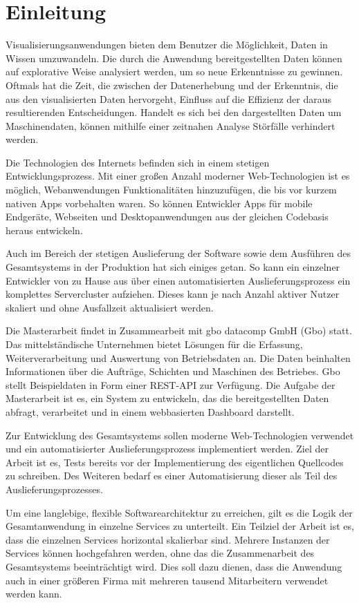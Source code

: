 \chapter{Einleitung}
\label{chap:einleitung}
Visualisierungsanwendungen bieten dem Benutzer die Möglichkeit,
Daten in Wissen umzuwandeln. Die durch die Anwendung bereitgestellten
Daten können auf explorative Weise analysiert werden, um so neue
Erkenntnisse zu gewinnen. Oftmals hat die Zeit, die zwischen der 
Datenerhebung und der Erkenntnis, die aus den visualisierten Daten hervorgeht,
Einfluss auf die Effizienz der daraus resultierenden Entscheidungen.
Handelt es sich bei den dargestellten Daten um Maschinendaten,
können mithilfe einer zeitnahen Analyse Störfälle verhindert werden.

Die Technologien des Internets befinden sich in einem stetigen Entwicklungsprozess.
Mit einer großen Anzahl moderner Web-Technologien ist es möglich, Webanwendungen Funktionalitäten
hinzuzufügen, die bis vor kurzem nativen Apps vorbehalten waren. So können Entwickler
Apps für mobile Endgeräte, Webseiten und Desktopanwendungen aus der gleichen Codebasis
heraus entwickeln.

Auch im Bereich der stetigen Auslieferung der Software sowie dem Ausführen des Gesamtsystems in der 
Produktion hat sich einiges getan. So kann ein einzelner Entwickler von zu Hause aus über einen automatisierten 
Auslieferungsprozess ein komplettes Servercluster aufziehen. Dieses kann je nach Anzahl aktiver Nutzer skaliert
und ohne Ausfallzeit aktualisiert werden.

Die Masterarbeit findet in Zusammearbeit mit gbo datacomp GmbH (Gbo) statt.
Das mittelständische Unternehmen bietet Lösungen für die Erfassung,
Weiterverarbeitung und Auswertung von Betriebsdaten an. Die Daten
beinhalten Informationen über die Aufträge, Schichten und Maschinen
des Betriebes. Gbo stellt Beispieldaten in Form einer REST-API
zur Verfügung. Die Aufgabe der Masterarbeit ist es, ein System zu entwickeln,
das die bereitgestellten Daten abfragt, verarbeitet und in einem webbasierten
Dashboard darstellt.

Zur Entwicklung des Gesamtsystems sollen moderne Web-Technologien verwendet
und ein automatisierter Auslieferungsprozess implementiert werden. Ziel der Arbeit ist es,
Tests bereits vor der Implementierung des eigentlichen Quellcodes zu schreiben. Des Weiteren 
bedarf es einer Automatisierung dieser als Teil des Auslieferungsprozesses. 

Um eine langlebige, flexible Softwarearchitektur zu erreichen, gilt es die Logik
der Gesamtanwendung in einzelne Services zu unterteilt. Ein Teilziel der Arbeit
ist es, dass die einzelnen Services horizontal skalierbar sind. Mehrere Instanzen
der Services können hochgefahren werden, ohne das die Zusammenarbeit
des Gesamtsystems beeinträchtigt wird. Dies soll dazu dienen, dass die Anwendung
auch in einer größeren Firma mit mehreren tausend Mitarbeitern verwendet werden kann.

